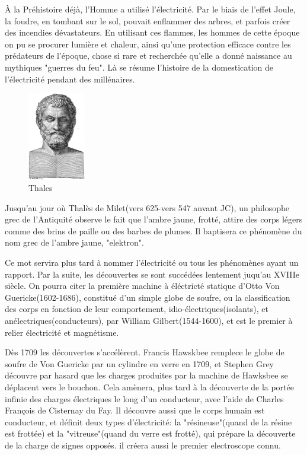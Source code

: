\documentclass[12pt]{report}
\begin{document}
	    À la Préhistoire déjà, l'Homme a utilisé l'électricité. Par le biais de l'effet Joule, la foudre, en tombant sur le sol, pouvait enflammer des arbres, et parfois créer des incendies dévastateurs. En utilisant ces flammes, les hommes de cette époque on pu se procurer lumière et chaleur, ainsi qu'une protection efficace contre les prédateurs de l'époque, chose si rare et recherchée qu'elle a donné naissance au mythiques "guerres du feu". Là se résume l'histoire de la domestication de l'électricité pendant des millénaires.
\begin{figure}
  \begin{center}
    \includegraphics[width=0.225\textwidth]{thales}
  \end{center}
  \caption{Thales}
\end{figure} Jusqu'au jour où Thalès de Milet(vers 625-vers 547 anvant JC), un philosophe grec de l'Antiquité observe le fait que l'ambre jaune, frotté, attire des corps légers comme des brins de paille ou des barbes de plumes. Il baptisera ce phénomène du nom grec de l'ambre jaune, "elektron".

  Ce mot servira plus tard à nommer l'électricité ou tous les phénomènes ayant un rapport. Par la suite, les découvertes se sont succédées lentement juqu'au XVIIIe siècle. On pourra citer la première machine à éléctricté statique d'Otto Von Guericke(1602-1686), constitué d'un simple globe de soufre, ou la classification des corps en fonction de leur comportement, idio-électriques(isolants), et anélectriques(conducteurs), par William Gilbert(1544-1600), et est le premier à relier électricité et magnétisme.

    Dès 1709 les découvertes s'accélèrent. Francis Hawskbee remplece le globe de soufre de Von Guericke par un cylindre en verre en 1709, et Stephen Grey découvre par hasard que les charges produites par la machine de Hawksbee se déplacent vers le bouchon. Cela amènera, plus tard à la découverte de la portée infinie des charges électriques le long d'un conducteur, avec l'aide de Charles François de Cisternay du Fay. Il découvre aussi que le corps humain est conducteur, et définit deux types d'électricité: la "résineuse"(quand de la résine est frottée) et la "vitreuse"(quand du verre est frotté), qui prépare la découverte de la charge de signes opposés. il créera aussi le premier electroscope connu.
\end{document}
